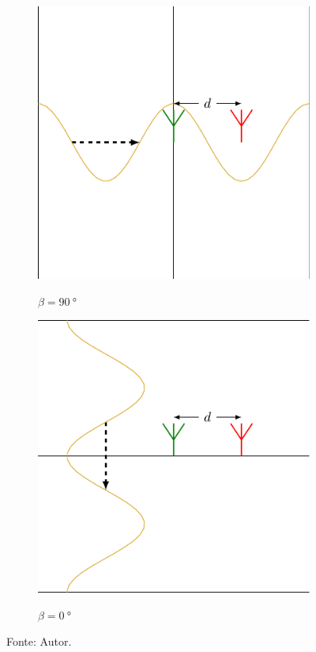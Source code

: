 \begin{figure}
    \hfill
    \begin{subfigure}[b]{0.45\textwidth}
        \centering
        \caption{$\beta=\SI{90}{\degree}$}
        \includegraphics{../pictures/AoA_3.pdf}
        \label{fig:AoA:3}
    \end{subfigure}
    \hfill
    \begin{subfigure}[b]{0.45\textwidth}
        \centering
        \caption{$\beta=\SI{0}{\degree}$}
        \includegraphics{../pictures/AoA_4.pdf}
        \label{fig:AoA:4}
    \end{subfigure}
    \hfill

    \caption*{Fonte: Autor.}
\end{figure}

